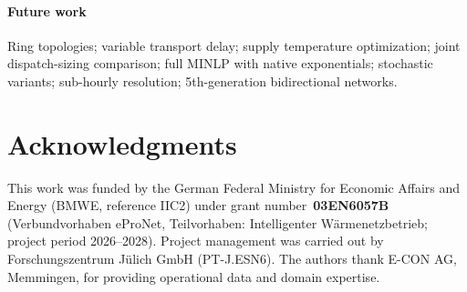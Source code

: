 \documentclass[review,3p]{elsarticle}
\begin{document}
\paragraph{Future work}
Ring topologies; variable transport delay; supply temperature
optimization; joint dispatch-sizing comparison; full MINLP with
native exponentials; stochastic variants; sub-hourly resolution;
5th-generation bidirectional networks.

\section*{Acknowledgments}
This work was funded by the German Federal Ministry for Economic Affairs and
Energy (BMWE, reference IIC2) under grant number~\textbf{03EN6057B}
(Verbundvorhaben eProNet, Teilvorhaben: Intelligenter Wärmenetzbetrieb;
project period 2026--2028).
Project management was carried out by Forschungszentrum Jülich GmbH
(PT-J.ESN6).
The authors thank E-CON AG, Memmingen, for providing operational data and
domain expertise.
\end{document}
